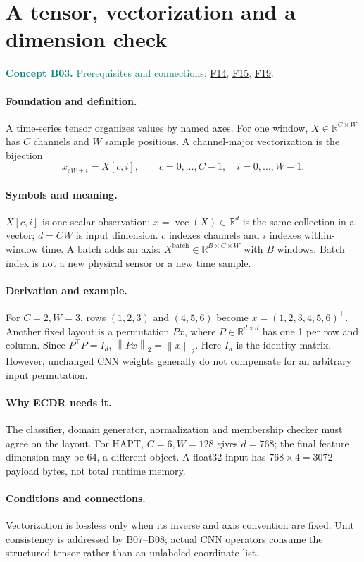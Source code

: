 \documentclass[11pt,a4paper]{article}
\newcommand{\R}{\mathbb R}
\newcommand{\norm}[1]{\left\lVert#1\right\rVert}
\newcommand{\conceptid}{Front matter}
\newcommand{\concept}[3]{\clearpage\renewcommand{\conceptid}{#1}%
\section{#2}\label{concept:#1}%
\textcolor{teal}{\textbf{Concept #1.} Prerequisites and connections: #3.}\par
\typeout{ECDR-CONCEPT-START #1 PAGE=\thepage}}
\begin{document}
\concept{B03}{A tensor, vectorization and a dimension check}{\hyperref[concept:F14]{F14}, \hyperref[concept:F15]{F15}, \hyperref[concept:F19]{F19}}
\paragraph{Foundation and definition.}
A time-series tensor organizes values by named axes. For one window,
$X\in\R^{C\times W}$ has $C$ channels and $W$ sample positions. A
channel-major vectorization is the bijection
\[
 x_{cW+i}=X[c,i],\qquad
 c=0,\ldots,C-1,\quad i=0,\ldots,W-1.
\]
\paragraph{Symbols and meaning.}
$X[c,i]$ is one scalar observation; $x=\operatorname{vec}(X)\in\R^d$ is
the same collection in a vector; $d=CW$ is input dimension. $c$ indexes
channels and $i$ indexes within-window time. A batch adds an axis:
$X^{\mathrm{batch}}\in\R^{B\times C\times W}$ with $B$ windows. Batch
index is not a new physical sensor or a new time sample.
\paragraph{Derivation and example.}
For $C=2,W=3$, rows $(1,2,3)$ and $(4,5,6)$ become
$x=(1,2,3,4,5,6)^\top$. Another fixed layout is a permutation $Px$,
where $P\in\R^{d\times d}$ has one 1 per row and column. Since
$P^\top P=I_d$, $\norm{Px}_2=\norm{x}_2$. Here $I_d$ is the identity
matrix. However, unchanged CNN weights generally do not compensate for an
arbitrary input permutation.
\paragraph{Why ECDR needs it.}
The classifier, domain generator, normalization and membership checker must
agree on the layout. For HAPT, $C=6,W=128$ gives $d=768$; the final feature
dimension may be 64, a different object. A float32 input has
$768\times4=3072$ payload bytes, not total runtime memory.
\paragraph{Conditions and connections.}
Vectorization is lossless only when its inverse and axis convention are
fixed. Unit consistency is addressed by \hyperref[concept:B07]{B07}--\hyperref[concept:B08]{B08}; actual CNN operators
consume the structured tensor rather than an unlabeled coordinate list.
\par\label{endconcept:B03}
\end{document}
